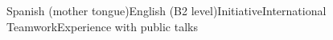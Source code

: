Spanish (mother tongue)\spaced English (B2 level)\spaced  Initiative\spaced International Teamwork\spaced Experience with public talks\,